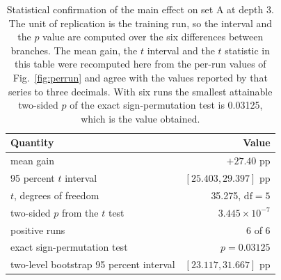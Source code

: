 \begin{table}[!tbh]
\centering\footnotesize\setlength{\tabcolsep}{6pt}
\begin{tabular}{|l|r|}
\hline
\textbf{Quantity} & \textbf{Value} \\
\hline
mean gain & $+27.40$ pp \\ \hline
95 percent $t$ interval & $[25.403, 29.397]$ pp \\ \hline
$t$, degrees of freedom & 35.275, $\mathrm{df} = 5$ \\ \hline
two-sided $p$ from the $t$ test & $3.445 \times 10^{-7}$ \\ \hline
positive runs & 6 of 6 \\ \hline
exact sign-permutation test & $p = 0.03125$ \\ \hline
two-level bootstrap 95 percent interval & $[23.117, 31.667]$ pp \\ \hline
\end{tabular}
\caption{Statistical confirmation of the main effect on set A at depth 3. The unit
of replication is the training run, so the interval and the $p$ value are computed
over the six differences between branches. The mean gain, the $t$ interval and the
$t$ statistic in this table were recomputed here from the per-run values of
Fig.~\ref{fig:perrun} and agree with the values reported by that series to three
decimals. With six runs the smallest attainable two-sided $p$ of the exact
sign-permutation test is 0.03125, which is the value obtained.}
\label{tab:stats}
\end{table}
